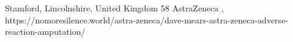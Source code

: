           {Stamford, Lincolnshire, United Kingdom}
          {58}
          {AstraZeneca}
          {}
          {
            ,
          }
          {https://nomoresilence.world/astra-zeneca/dave-mears-astra-zeneca-adverse-reaction-amputation/}

